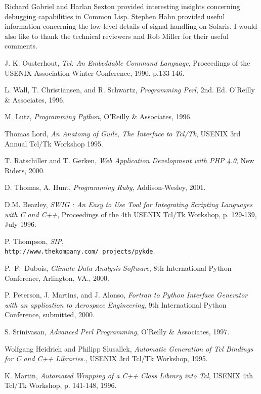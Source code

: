 Richard Gabriel and Harlan Sexton provided interesting insights
concerning debugging capabilities in Common Lisp.  Stephen Hahn
provided useful information concerning the low-level details of signal
handling on Solaris.  I would also like to thank the technical
reviewers and Rob Miller for their useful comments.

\begin{thebibliography}{99}


 J. K. Ousterhout, {\em Tcl: An Embeddable Command Language},
Proceedings of the USENIX Association Winter Conference, 1990. p.133-146.

 L. Wall, T. Christiansen, and R. Schwartz, {\em Programming Perl}, 2nd. Ed.
O'Reilly \& Associates, 1996.

 M. Lutz, {\em Programming Python}, O'Reilly \& Associates, 1996.

 Thomas Lord, {\em An Anatomy of Guile, The Interface to 
Tcl/Tk}, USENIX 3rd Annual Tcl/Tk Workshop 1995.

 T. Ratschiller and T. Gerken, {\em Web Application Development with PHP 4.0},
New Riders, 2000.

 D. Thomas, A. Hunt, {\em Programming Ruby}, Addison-Wesley, 2001.

 D.M. Beazley, {\em SWIG : An Easy to Use Tool for Integrating Scripting Languages with C and C++}, Proceedings of the 4th USENIX Tcl/Tk Workshop, p. 129-139, July 1996. 

 P. Thompson, {\em SIP},\\
{\tt http://www.thekompany.com/ projects/pykde}.

 P.~F.~Dubois, {\em Climate Data Analysis Software}, 8th International Python Conference,
Arlington, VA., 2000.

 P. Peterson, J. Martins, and J. Alonso,
{\em Fortran to Python Interface Generator with an application to Aerospace
Engineering}, 9th International Python Conference, submitted, 2000.

 S. Srinivasan, {\em Advanced Perl Programming}, O'Reilly \& Associates, 1997.

 Wolfgang Heidrich and Philipp Slusallek, {\em Automatic Generation of Tcl Bindings for C and C++ Libraries.},
USENIX 3rd Tcl/Tk Workshop, 1995.

 K. Martin, {\em Automated Wrapping of a C++ Class Library into Tcl},
USENIX 4th Tcl/Tk Workshop, p. 141-148, 1996. 


\end{thebibliography}
